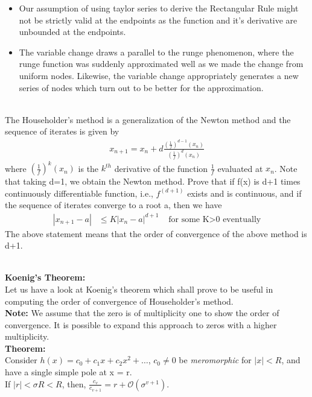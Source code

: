 \documentclass[letterpaper]{exam}
\begin{document}
\begin{questions}
\begin{solution}
\begin{itemize}
    \item Our assumption of using taylor series to derive the Rectangular Rule might not be strictly valid at the endpoints as the function and it's derivative are unbounded at the endpoints.
    \item The variable change draws a parallel to the runge phenomenon, where the runge function was suddenly approximated well as we made the change from uniform nodes. Likewise, the variable change appropriately generates a new series of nodes which turn out to be better for the approximation.
\end{itemize}
\end{solution}
\\
The Householder's method is a generalization of the Newton method and the sequence of iterates is given by
\begin{align*}
    x_{n+1} = x_n + d\frac{\left(\frac{1}{f}\right)^{d-1}(x_n)}{\left(\frac{1}{f}\right)^{d}(x_n)}
\end{align*}
where $\left(\frac{1}{f}\right)^k(x_n)$ is the $k^{th}$ derivative of the function $\frac{1}{f}$ evaluated at $x_n$. Note that taking d=1, we obtain the Newton method. Prove that if f(x) is d+1 times continuously differentiable function, i.e., $f^{(d+1)}$ exists and is continuous, and if the sequence of iterates converge to a root a, then we have
\begin{align*}
    \left| x_{n+1} - a\right| &\leq K\left|x_n - a\right|^{d+1} &\mbox{ for some K$>$0 eventually}
\end{align*}
The above statement means that the order of convergence of the above method is d+1.
\begin{solution}
\\
\textbf{Koenig's Theorem:}\\
Let us have a look at Koenig's theorem which shall prove to be useful in computing the order of convergence of Householder's method.\\ 
\textbf{Note:} We assume that the zero is of multiplicity one to show the order of convergence. It is possible to expand this approach to zeros with a higher multiplicity. \\
\textbf{Theorem:}\\
Consider $h(x) = c_0 + c_1x+c_2x^2+ \ldots$, $c_0 \neq 0 $ be \textit{meromorphic} for $\left|x\right| < R$, and have a single simple pole at x = r.\\
If $\left|r\right| < \sigma R < R$, then, $\frac{c_v}{c_{v+1}} = r + \mathcal{O}\left(\sigma^{v+1}\right)$.\\

\end{solution}
\end{questions}
\end{document}
